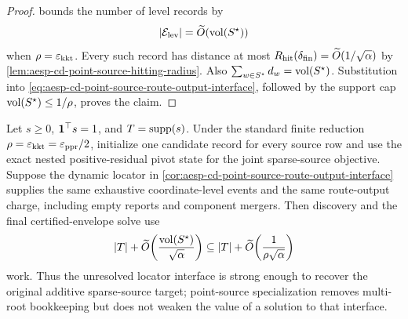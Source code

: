 \begin{proof}
 bounds the number of level records by
\begin{equation*}
 |\mathcal E_{\rm lev}|
 =\widetilde O(\operatorname{vol}(S^\star))
\end{equation*}
when \(\rho=\varepsilon_{\mathrm{kkt}}\).  Every such record has distance at most
\(R_{\rm hit}(\delta_{\rm fin})=\widetilde O(1/\sqrt\alpha)\) by
\cref{lem:aesp-cd-point-source-hitting-radius}.  Also
\(\sum_{w\in S^\star}d_w=\operatorname{vol}(S^\star)\).
Substitution into
\cref{eq:aesp-cd-point-source-route-output-interface}, followed by the
support cap \(\operatorname{vol}(S^\star)\leq1/\rho\), proves the claim.
\end{proof}

\begin{corollary}
\label{cor:aesp-cd-sparse-source-route-output-interface}
Let $s\geq0$, $\mathbf{1}^\top s=1$, and $T=\operatorname{supp}(s)$.  Under the standard
finite reduction $\rho=\varepsilon_{\mathrm{kkt}}=\varepsilon_{\mathrm{ppr}}/2$, initialize one candidate record
for every source row and use the exact nested positive-residual pivot state
for the joint sparse-source objective.  Suppose the dynamic locator in
\cref{cor:aesp-cd-point-source-route-output-interface} supplies the same
exhaustive coordinate-level events and the same route-output charge, including
empty reports and component mergers.  Then discovery and the final
certified-envelope solve use
\begin{equation}
 |T|+\widetilde O\!\left(
  \frac{\operatorname{vol}(S^\star)}{\sqrt\alpha}
 \right)
 \subseteq
 |T|+\widetilde O\!\left(
  \frac1{\rho\sqrt\alpha}
 \right)
 \label{eq:aesp-cd-sparse-source-route-output-interface}
\end{equation}
work.  Thus the unresolved locator interface is strong enough to recover the
original additive sparse-source target; point-source specialization removes
multi-root bookkeeping but does not weaken the value of a solution to that
interface.
\end{corollary}


